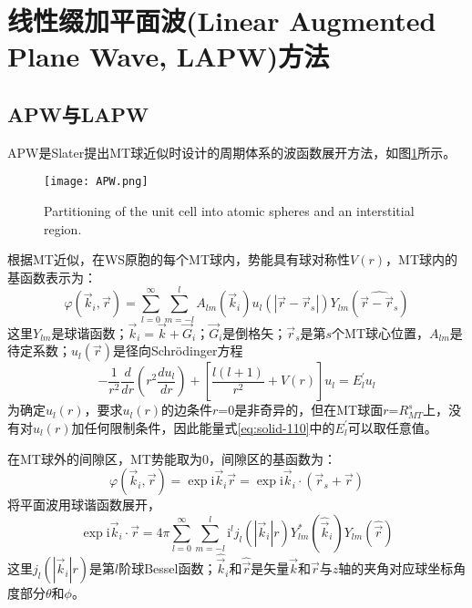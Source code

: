 \section{线性缀加平面波(Linear Augmented Plane Wave, LAPW)方法}
\subsection{APW与LAPW}
APW是Slater提出MT球近似时设计的周期体系的波函数展开方法\cite{PR51-846_1937,PR91-528_1953}，如图\ref{Muffin_tin_0}所示。%
\begin{figure}[h!]
\centering
\texttt{[image: APW.png]}
\caption{\small \textrm{Partitioning of the unit cell into atomic spheres and an interstitial region.}}%
\label{Muffin_tin_0}
\end{figure}
根据MT近似，在WS原胞的每个MT球内，势能具有球对称性$V(r)$，MT球内的基函数表示为：
\begin{equation}
  \varphi(\vec k_i,\vec r)=\sum_{l=0}^{\infty}\sum_{m=-l}^lA_{lm}(\vec k_i)u_l(|\vec r-\vec r_s|)Y_{lm}(\widehat{\vec r-\vec r_s})
  \label{eq:solid-109}
\end{equation}
这里$Y_{lm}$是球谐函数；$\vec k_i=\vec k+\vec G_i$；$\vec G_i$是倒格矢；$\vec r_s$是第$s$个MT球心位置，$A_{lm}$是待定系数；$u_l(\vec r)$是径向Schr\"odinger方程
\begin{equation}
  -\frac1{r^2}\frac d{dr}\left(r^2\frac{du_l}{dr}\right)+\left[\frac{l(l+1)}{r^2}+V(r)\right]u_l=E_l^{\prime}u_l
  \label{eq:solid-110}
\end{equation}
为确定$u_l(r)$，要求$u_l(r)$的边条件$r$=0是非奇异的，但在MT球面$r$=$R_{MT}^s$上，没有对$u_l(r)$加任何限制条件，因此能量式\eqref{eq:solid-110}中的$E_l^{\prime}$可以取任意值。

在MT球外的间隙区，MT势能取为0，间隙区的基函数为：
\begin{equation}
	\varphi(\vec k_i,\vec r)=\exp\mathrm{i}\vec k_i\vec r=\exp\mathrm{i}\vec k_i\cdot(\vec r_s+\vec r)
  \label{eq:solid-111}
\end{equation}
将平面波用球谐函数展开，
\begin{equation}
	\exp\mathrm{i}\vec k_i\cdot\vec r=4\pi\sum_{l=0}^{\infty}\sum_{m=-l}^l\mathrm{i}^lj_l(|\vec k_i|r)Y_{lm}^{\ast}(\hat{\vec k}_i)Y_{lm}(\hat{\vec r})
  \label{eq:solid-112}
\end{equation}
这里$j_l(|\vec k_i|r)$是第$l$阶球Bessel函数；$\hat{\vec k}_i$和$\hat{\vec r}$是矢量$\vec k$和$\vec r$与$z$轴的夹角对应球坐标角度部分$\theta$和$\phi$。

